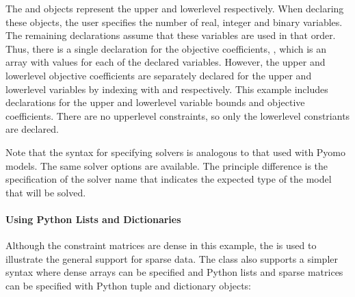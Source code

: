 \documentclass[letterpaper,10pt,english]{sphinxmanual}
\begin{document}
\begin{sphinxVerbatim}[commandchars=\\\{\}]
\PYG{p}{[}\PYG{p}{]}
\PYG{p}{[}\PYG{p}{]}
\end{sphinxVerbatim}

The  and  objects represent the upper\sphinxhyphen{} and lower\sphinxhyphen{}level
respectively.  When declaring these objects, the user specifies the number
of real, integer and binary variables.  The remaining declarations assume
that these variables are used in that order.  Thus, there is a single
declaration for the objective coefficients, , which is an array
with values for each of the declared variables.  However, the upper\sphinxhyphen{}
and lower\sphinxhyphen{}level objective coefficients are separately declared for
the upper\sphinxhyphen{} and lower\sphinxhyphen{}level variables by indexing  with  and
 respectively.  This example includes declarations for the upper\sphinxhyphen{}
and lower\sphinxhyphen{}level variable bounds and objective coefficients.  There are no
upper\sphinxhyphen{}level constraints, so only the lower\sphinxhyphen{}level constriants are declared.

Note that the syntax for specifying solvers is analogous to that used
with Pyomo models.  The same solver options are available.  The principle
difference is the specification of the solver name that indicates the
expected type of the model that will be solved.


\paragraph{Using Python Lists and Dictionaries}
\label{\detokenize{examples:using-python-lists-and-dictionaries}}
Although the constraint matrices are dense in this example, the
 is used to illustrate the general support for sparse data.
The  class also supports a simpler syntax
where dense arrays can be specified and Python lists and sparse matrices
can be specified with Python tuple and dictionary objects:
\end{document}
